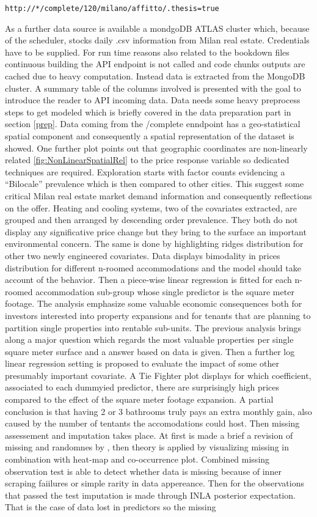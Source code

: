 \documentclass[
  12pt,
  a4paper,
  oneside]{book}
\theoremstyle{definition}
\theoremstyle{definition}
\theoremstyle{definition}
\theoremstyle{remark}
\begin{document}
\texttt{http://*/complete/120/milano/affitto/.thesis=true}

As a further data source is available a mondgoDB ATLAS cluster which, because of the scheduler, stocks daily .csv information from Milan real estate. Credentials have to be supplied. For run time reasons also related to the bookdown files continuous building the API endpoint is not called and code chunks outputs are cached due to heavy computation. Instead data is extracted from the MongoDB cluster. A summary table of the columns involved is presented with the goal to introduce the reader to API incoming data. Data needs some heavy preprocess steps to get modeled which is briefly covered in the data preparation part in section \ref{prep}. Data coming from the /complete enndpoint has a geo-statistical spatial component and consequently a spatial representation of the dataset is showed. One further plot points out that geographic coordinates are non-linearly related \ref{fig:NonLinearSpatialRel} to the price response variable so dedicated techniques are required. Exploration starts with factor counts evidencing a ``Bilocale'' prevalence which is then compared to other cities. This suggest some critical Milan real estate market demand information and consequently reflections on the offer. Heating and cooling systems, two of the covariates extracted, are grouped and then arranged by descending order prevalence. They both do not display any significative price change but they bring to the surface an important environmental concern. The same is done by highlighting ridges distribution for other two newly engineered covariates. Data displays bimodality in prices distribution for different n-roomed accommodations and the model should take account of the behavior. Then a piece-wise linear regression is fitted for each n-roomed accommodation sub-group whose single predictor is the square meter footage. The analysis emphasize some valuable economic consequences both for investors interested into property expansions and for tenants that are planning to partition single properties into rentable sub-units. The previous analysis brings along a major question which regards the most valuable properties per single square meter surface and a answer based on data is given. Then a further log linear regression setting is proposed to evaluate the impact of some other presumably important covariate. A Tie Fighter plot displays for which coefficient, associated to each dummyied predictor, there are surprisingly high prices compared to the effect of the square meter footage expansion. A partial conclusion is that having 2 or 3 bathrooms truly pays an extra monthly gain, also caused by the number of tentants the accomodations could host. Then missing assessement and imputation takes place. At first is made a brief a revision of missing and randomnes by \citet{Little}, then theory is applied by visualizing missing in combination with heat-map and co-occurrence plot. Combined missing observation test is able to detect whether data is missing because of inner scraping faiilures or simple rarity in data appereance. Then for the observations that passed the test imputation is made through INLA posterior expectation. That is the case of data lost in predictors so the missing 
\end{document}
